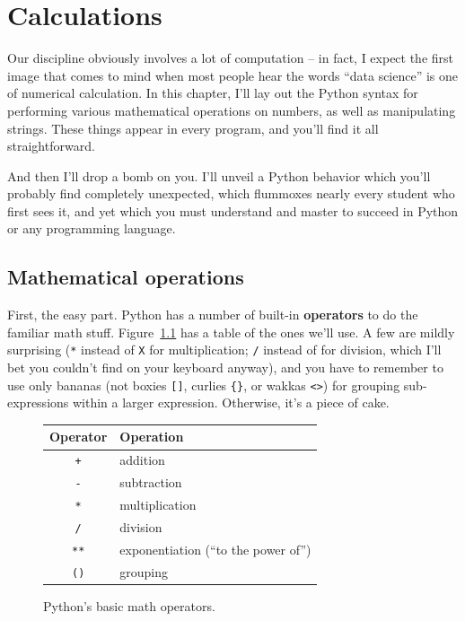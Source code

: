 
\chapter{Calculations}
\label{ch:calculations}

Our discipline obviously involves a lot of computation -- in fact, I expect the
first image that comes to mind when most people hear the words ``data science''
is one of numerical calculation. In this chapter, I'll lay out the Python
syntax for performing various mathematical operations on numbers, as well as
manipulating strings. These things appear in every program, and you'll find it
all straightforward.

And then I'll drop a bomb on you. I'll unveil a Python behavior which you'll
probably find completely unexpected, which flummoxes nearly every student who
first sees it, and yet which you must understand and master to succeed in
Python or any programming language.

\section{Mathematical operations}


First, the easy part. Python has a number of built-in \textbf{operators} to do
the familiar math stuff. Figure~\ref{fig:mathOps} has a table of the ones we'll
use. A few are mildly surprising (\texttt{*} instead of \texttt{X} for
multiplication; \texttt{/} instead of  for division, which I'll bet you
couldn't find on your keyboard anyway), and you have to remember to use only
bananas (not boxies \texttt{[]}, curlies \texttt{\{\}}, or wakkas \texttt{<>})
for grouping sub-expressions within a larger expression. Otherwise, it's a
piece of cake.

\begin{figure}[ht]
\centering
\begingroup
\par\tagpdfparaOff
{}
\begin{tabular}{c | l}
\hline
Operator & Operation \\
\hline
\texttt{+} & addition \\
\texttt{-} & subtraction \\
\texttt{*} & multiplication \\
\texttt{/} & division \\
\texttt{**} & exponentiation (``to the power of'')\\
\texttt{()} & grouping \\
\hline
\end{tabular}\par
\endgroup
\smallskip
\caption{Python's basic math operators.}
\label{fig:mathOps}
\end{figure}

